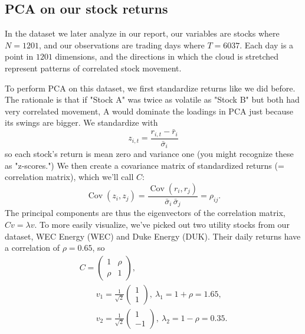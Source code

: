 \documentclass[11pt,letterpaper]{article}
\begin{document}
\subsection{PCA on our stock returns}
\label{sec:stock-pca}
In the dataset we later analyze in our report, our variables are stocks where $N = 1201$, and
our observations are trading days where $T = 6037$. Each day is a point in $1201$ dimensions,
and the directions in which the cloud is stretched represent patterns of correlated stock
movement.

To perform PCA on this dataset, we first standardize returns like we did before. The rationale
is that if  "Stock A" was twice as volatile as "Stock B" but both had very correlated movement,
A would dominate the loadings in PCA just because its swings are bigger. We standardize with
\[
    z_{i,t}=\frac{r_{i,t}-\bar{r}_i}{\bar{\sigma}_i}
\]
so each stock's return is mean zero and variance one (you might recognize these as "z-scores.")
We then create a covariance matrix of standardized returns (= correlation matrix), which we'll
call $C$:
\[
    \operatorname{Cov}(z_i,z_j)=\frac{\operatorname{Cov}(r_i,r_j)}{\bar\sigma_i\,\bar\sigma_j}=\rho_{ij}.
\]
The principal components are thus the eigenvectors of the correlation matrix, $Cv=\lambda v$. To
more easily visualize, we've picked out two utility stocks from our dataset, WEC Energy (WEC)
and Duke Energy (DUK). Their daily returns have a correlation of $\rho=0.65$, so
\[
    \begin{gathered}
        C=\begin{pmatrix}1&\rho\\ \rho&1\end{pmatrix},\\
        \qquad
        v_1=\tfrac{1}{\sqrt2}\begin{pmatrix}1\\1\end{pmatrix},\ \lambda_1=1+\rho=1.65,
        \\
        \qquad
        v_2=\tfrac{1}{\sqrt2}\begin{pmatrix}1\\-1\end{pmatrix},\ \lambda_2=1-\rho=0.35.
    \end{gathered}
\]
\end{document}
